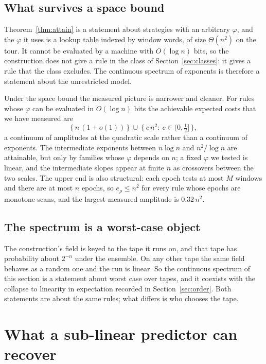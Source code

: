 \documentclass[11pt]{article}
\begin{document}
\subsection{What survives a space bound}

Theorem~\ref{thm:attain} is a statement about strategies with an arbitrary $\varphi$, and the
$\varphi$ it uses is a lookup table indexed by window words, of size $\Theta(n^2)$ on the tour.
It cannot be evaluated by a machine with $O(\log n)$ bits, so the construction does not give a
rule in the class of Section~\ref{sec:classes}: it gives a rule that the class excludes. The
continuous spectrum of exponents is therefore a statement about the unrestricted model.

Under the space bound the measured picture is narrower and cleaner. For rules whose $\varphi$
can be evaluated in $O(\log n)$ bits the achievable expected costs that we have measured are
\[
\big\{\,n\,(1+o(1))\,\big\}\ \cup\ \big\{\,c\,n^2:\ c\in(0,\tfrac12]\,\big\},
\]
a continuum of amplitudes at the quadratic scale rather than a continuum of exponents. The
intermediate exponents between $n\log n$ and $n^2/\log n$ are attainable, but only by families
whose $\varphi$ depends on $n$; a fixed $\varphi$ we tested is linear, and the intermediate
slopes appear at finite $n$ as crossovers between the two scales. The upper end is also
structural: each epoch tests at most $M$ windows and there are at most $n$ epochs, so
$e_\rho\le n^2$ for every rule whose epochs are monotone scans, and the largest measured
amplitude is $0.32\,n^2$.

\subsection{The spectrum is a worst-case object}

The construction's field is keyed to the tape it runs on, and that tape has probability
about $2^{-n}$ under the ensemble. On any other tape the same field behaves as a random one
and the run is linear. So the continuous spectrum of this section is a statement about
worst case over tapes, and it coexists with the collapse to linearity in expectation
recorded in Section~\ref{sec:order}. Both statements are about the same rules; what differs
is who chooses the tape.

\section{What a sub-linear predictor can recover}\label{sec:ceiling}
\end{document}
